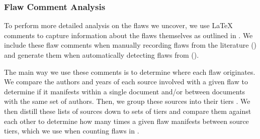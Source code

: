 \subsubsection{Flaw Comment Analysis}\label{flaw-comment-analysis}

To perform more detailed analysis on the flaws we uncover, we use \LaTeX{}
comments to capture information about the flaws themselves as outlined in
. We include these flaw comments when manually
recording flaws from the literature () and generate them when
automatically detecting flaws from \ourApproachGlossary{}
().

The main way we use these comments is to determine where each flaw originates.
We compare the authors and years of each source involved with a given flaw
to determine if it manifests within a single document and/or between documents
with the same set of authors. Then, we group these sources into their tiers
.
We then distill these lists of sources down to sets of tiers and compare them
against each other to determine how many times a given flaw manifests between
source tiers, which we use when counting flaws in .


